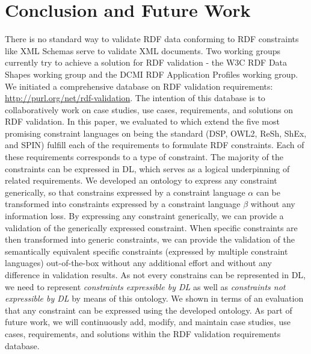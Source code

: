 \documentclass{llncs}
\begin{document}
\section{Conclusion and Future Work}
There is no standard way to validate RDF data conforming to RDF constraints like XML Schemas serve to validate XML documents.
Two working groups currently try to achieve a solution for RDF validation - the W3C RDF Data Shapes working group and the DCMI RDF Application Profiles working group. 
We initiated a comprehensive database on RDF validation requirements: \url{http://purl.org/net/rdf-validation}.
The intention of this database is to collaboratively work on case studies, use cases, requirements, and solutions on RDF validation.
In this paper, we evaluated to which extend the five most promising constraint languages on being the standard (DSP, OWL2, ReSh, ShEx, and SPIN) fulfill each of the requirements to formulate RDF constraints.
Each of these requirements corresponds to a type of constraint.
The majority of the constraints can be expressed in DL, which serves as a logical underpinning of related requirements.
We developed an ontology to express any constraint generically, so that constrains expressed by a constraint language $\alpha$ can be transformed into constraints expressed by a constraint language $\beta$ without any information loss.
By expressing any constraint generically, we can provide a validation of the generically expressed constraint.
When specific constraints are then transformed into generic constraints, we can provide the validation of the semantically equivalent specific constraints (expressed by multiple constraint languages) out-of-the-box without any additional effort and without any difference in validation results. 
As not every constrains can be represented in DL, we need to represent \emph{constraints expressible by DL} as well as \emph{constraints not expressible by DL} by means of this ontology.
We shown in terms of an evaluation that any constraint can be expressed using the developed ontology.
As part of future work, we will continuously add, modify, and maintain case studies, use cases, requirements, and solutions within the RDF validation requirements database.



{}

\setcounter{tocdepth}{1}
\end{document}
